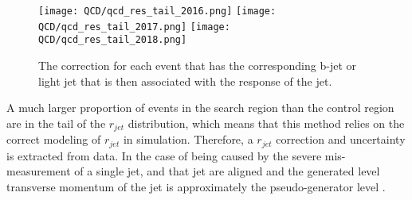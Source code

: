 
\begin{figure}
	\begin{center}
  \texttt{[image: QCD/qcd\_res\_tail\_2016.png]}
  \texttt{[image: QCD/qcd\_res\_tail\_2017.png]}
  \texttt{[image: QCD/qcd\_res\_tail\_2018.png]}
	\end{center}
	\caption[QCD Jet Response for each b-jet and light jet]{The correction for each event that has the corresponding b-jet or light jet that is then associated with the response of the jet. }
	\label{fig:qcd-cr-response-corr}
\end{figure}

A much larger proportion of events in the search region than the control region are in the tail of the $r_{jet}$ distribution, which means that this method relies on the correct modeling of $r_{jet}$ in simulation. Therefore, a $r_{jet}$ correction and uncertainty is extracted from data. In the case of \met{} being caused by the severe mis-measurement of a single jet, \met{} and that jet are aligned and the generated level transverse momentum of the jet is approximately the pseudo-generator level \pt.

